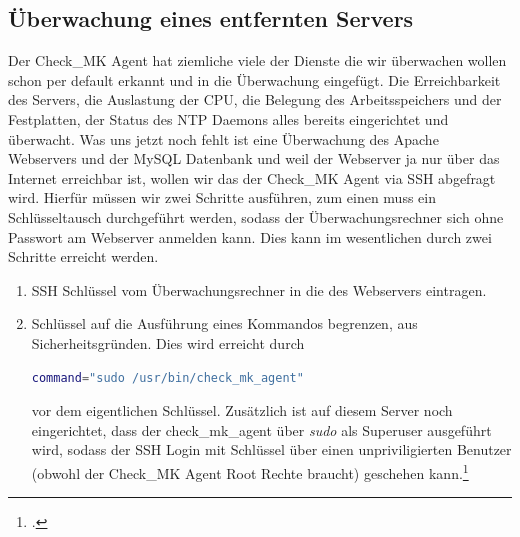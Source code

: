 \documentclass[12pt,a4paper,parskip,listof=totoc,bibliography=totoc]{scrreprt}
\begin{document}
	\subsection{Überwachung eines entfernten Servers}
	Der Check\_MK Agent hat ziemliche viele der Dienste die wir überwachen wollen schon per default erkannt und in die Überwachung eingefügt. Die Erreichbarkeit des Servers, die Auslastung der CPU, die Belegung des Arbeitsspeichers und der Festplatten, der Status des NTP Daemons alles bereits eingerichtet und überwacht. Was uns jetzt noch fehlt ist eine Überwachung des Apache Webservers und der MySQL Datenbank und weil der Webserver ja nur über das Internet erreichbar ist, wollen wir das der Check\_MK Agent via SSH abgefragt wird. Hierfür müssen wir zwei Schritte ausführen, zum einen muss ein Schlüsseltausch durchgeführt werden, sodass der Überwachungsrechner sich ohne Passwort am Webserver anmelden kann. Dies kann im wesentlichen durch zwei Schritte erreicht werden. 
	\begin{enumerate}
		\item SSH Schlüssel vom Überwachungsrechner in die  des Webservers eintragen.
		\item Schlüssel auf die Ausführung eines Kommandos begrenzen, aus Sicherheitsgründen. Dies wird erreicht durch
		\begin{lstlisting}[language=bash, caption=SSH Schlüssel auf ein Kommando begrenzen, label=lst:keybegr]
		command="sudo /usr/bin/check_mk_agent"\end{lstlisting}
		vor dem eigentlichen Schlüssel. Zusätzlich ist auf diesem Server noch eingerichtet, dass der check\_mk\_agent über \textit{sudo} als Superuser ausgeführt wird, sodass der SSH Login mit Schlüssel über einen unpriviligierten Benutzer (obwohl der Check\_MK Agent Root Rechte braucht) geschehen kann.\footcite{checkmkCheckBySSH2015}
	\end{enumerate}
\end{document}
